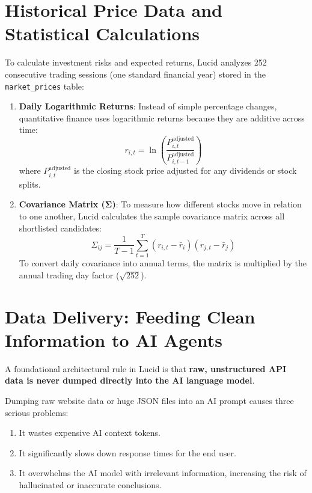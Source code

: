 \section{Historical Price Data and Statistical Calculations}
To calculate investment risks and expected returns, Lucid analyzes 252 consecutive trading sessions (one standard financial year) stored in the \texttt{market\_prices} table:

\begin{enumerate}
    \item \textbf{Daily Logarithmic Returns}:
    Instead of simple percentage changes, quantitative finance uses logarithmic returns because they are additive across time:
    \begin{equation}
    r_{i,t} = \ln \left( \frac{P_{i,t}^{\text{adjusted}}}{P_{i,t-1}^{\text{adjusted}}} \right)
    \end{equation}
    where $P_{i,t}^{\text{adjusted}}$ is the closing stock price adjusted for any dividends or stock splits.
    \item \textbf{Covariance Matrix ($\mathbf{\Sigma}$)}:
    To measure how different stocks move in relation to one another, Lucid calculates the sample covariance matrix across all shortlisted candidates:
    \begin{equation}
    \Sigma_{ij} = \frac{1}{T-1} \sum_{t=1}^{T} (r_{i,t} - \bar{r}_i)(r_{j,t} - \bar{r}_j)
    \end{equation}
    To convert daily covariance into annual terms, the matrix is multiplied by the annual trading day factor ($\sqrt{252}$).
\end{enumerate}

\section{Data Delivery: Feeding Clean Information to AI Agents}
A foundational architectural rule in Lucid is that \textbf{raw, unstructured API data is never dumped directly into the AI language model}.

Dumping raw website data or huge JSON files into an AI prompt causes three serious problems:
\begin{enumerate}
    \item It wastes expensive AI context tokens.
    \item It significantly slows down response times for the end user.
    \item It overwhelms the AI model with irrelevant information, increasing the risk of hallucinated or inaccurate conclusions.
\end{enumerate}

